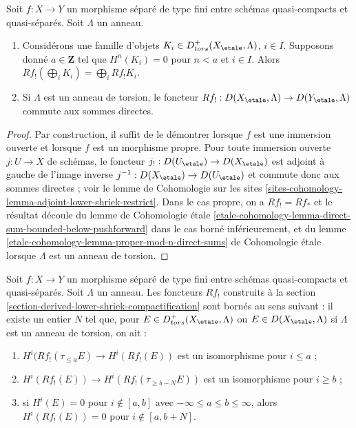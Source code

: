 \begin{lemma}
\label{lemma-derived-lower-shriek-commute-direct-sums}
Soit $f : X \to Y$ un morphisme séparé de type fini entre schémas quasi-compacts
et quasi-séparés. Soit $\Lambda$ un anneau.
\begin{enumerate}
\item Considérons une famille d'objets $K_i \in D^+_{tors}(X_\etale, \Lambda)$, $i \in I$.
Supposons donné $a \in \mathbf{Z}$ tel que
$H^n(K_i) = 0$ pour $n < a$ et $i \in I$. Alors $Rf_!(\bigoplus_i K_i) =
\bigoplus_i Rf_!K_i$.
\item Si $\Lambda$ est un anneau de torsion, le foncteur
$Rf_! : D(X_\etale, \Lambda) \to D(Y_\etale, \Lambda)$
commute aux sommes directes.
\end{enumerate}
\end{lemma}

\begin{proof}
Par construction, il suffit de le démontrer lorsque $f$ est une immersion ouverte
et lorsque $f$ est un morphisme propre. Pour toute immersion ouverte $j : U \to X$
de schémas, le foncteur $j_! : D(U_\etale) \to D(X_\etale)$ est
adjoint à gauche de l'image inverse $j^{-1} : D(X_\etale) \to D(U_\etale)$
et commute donc aux sommes directes ; voir le lemme de Cohomologie sur les sites
\ref{sites-cohomology-lemma-adjoint-lower-shriek-restrict}.
Dans le cas propre, on a $Rf_! = Rf_*$ et le résultat découle du
lemme de Cohomologie étale
\ref{etale-cohomology-lemma-direct-sum-bounded-below-pushforward}
dans le cas borné inférieurement, et du
lemme \ref{etale-cohomology-lemma-proper-mod-n-direct-sums} de Cohomologie étale
lorsque $\Lambda$ est un anneau de torsion.
\end{proof}

\begin{lemma}
\label{lemma-derived-lower-shriek-bounded}
Soit $f : X \to Y$ un morphisme séparé de type fini entre schémas quasi-compacts
et quasi-séparés. Soit $\Lambda$ un anneau. Les foncteurs $Rf_!$
construits à la section \ref{section-derived-lower-shriek-compactification}
sont bornés au sens suivant : il existe un entier $N$ tel que,
pour $E \in D^+_{tors}(X_\etale, \Lambda)$ ou $E \in D(X_\etale, \Lambda)$
si $\Lambda$ est un anneau de torsion, on ait :
\begin{enumerate}
\item $H^i(Rf_!(\tau_{\leq a}E) \to H^i(Rf_!(E))$ est un isomorphisme
pour $i \leq a$ ;
\item $H^i(Rf_!(E)) \to H^i(Rf_!(\tau_{\geq b - N}E))$ est un isomorphisme
pour $i \geq b$ ;
\item si $H^i(E) = 0$ pour $i \not \in [a, b]$ avec
$-\infty \leq a \leq b \leq \infty$, alors $H^i(Rf_!(E)) = 0$
pour $i \not \in [a, b + N]$.
\end{enumerate}
\end{lemma}

